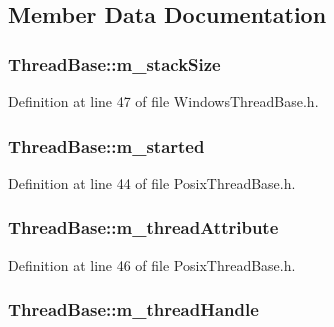 \subsection{Member Data Documentation}
\hypertarget{class_thread_base_a9c8b3446d099074f0f1608e5246e137d}{
\subsubsection[{m\-\_\-stack\-Size}]{ Thread\-Base\-::m\-\_\-stack\-Size\hspace{0.3cm}{\ttfamily [private]}}}\label{class_thread_base_a9c8b3446d099074f0f1608e5246e137d}


Definition at line 47 of file Windows\-Thread\-Base.\-h.

\hypertarget{class_thread_base_a5e2958ae98b989268d1e2be629789d64}{
\subsubsection[{m\-\_\-started}]{ Thread\-Base\-::m\-\_\-started\hspace{0.3cm}{\ttfamily [private]}}}\label{class_thread_base_a5e2958ae98b989268d1e2be629789d64}


Definition at line 44 of file Posix\-Thread\-Base.\-h.

\hypertarget{class_thread_base_ad0d98c6f93707aef346cc66d8de78729}{
\subsubsection[{m\-\_\-thread\-Attribute}]{ Thread\-Base\-::m\-\_\-thread\-Attribute\hspace{0.3cm}{\ttfamily [private]}}}\label{class_thread_base_ad0d98c6f93707aef346cc66d8de78729}


Definition at line 46 of file Posix\-Thread\-Base.\-h.

\hypertarget{class_thread_base_a4f279b94eef423109969f69fadd9e674}{
\subsubsection[{m\-\_\-thread\-Handle}]{ Thread\-Base\-::m\-\_\-thread\-Handle\hspace{0.3cm}{\ttfamily [private]}}}\label{class_thread_base_a4f279b94eef423109969f69fadd9e674}


